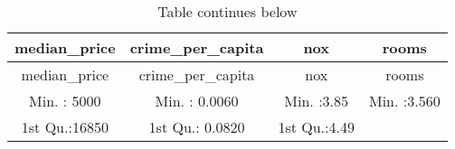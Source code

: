 \documentclass[
]{article}
\begin{document}
\begin{longtable}[]{@{}cccc@{}}
\caption{Table continues below}\tabularnewline
\toprule
\begin{minipage}[b]{0.20\columnwidth}\centering
median\_price\strut
\end{minipage} & \begin{minipage}[b]{0.23\columnwidth}\centering
crime\_per\_capita\strut
\end{minipage} & \begin{minipage}[b]{0.18\columnwidth}\centering
nox\strut
\end{minipage} & \begin{minipage}[b]{0.20\columnwidth}\centering
rooms\strut
\end{minipage}\tabularnewline
\midrule
\endfirsthead
\toprule
\begin{minipage}[b]{0.20\columnwidth}\centering
median\_price\strut
\end{minipage} & \begin{minipage}[b]{0.23\columnwidth}\centering
crime\_per\_capita\strut
\end{minipage} & \begin{minipage}[b]{0.18\columnwidth}\centering
nox\strut
\end{minipage} & \begin{minipage}[b]{0.20\columnwidth}\centering
rooms\strut
\end{minipage}\tabularnewline
\midrule
\endhead
\begin{minipage}[t]{0.20\columnwidth}\centering
Min. : 5000\strut
\end{minipage} & \begin{minipage}[t]{0.23\columnwidth}\centering
Min. : 0.0060\strut
\end{minipage} & \begin{minipage}[t]{0.18\columnwidth}\centering
Min. :3.85\strut
\end{minipage} & \begin{minipage}[t]{0.20\columnwidth}\centering
Min. :3.560\strut
\end{minipage}\tabularnewline
\begin{minipage}[t]{0.20\columnwidth}\centering
1st Qu.:16850\strut
\end{minipage} & \begin{minipage}[t]{0.23\columnwidth}\centering
1st Qu.: 0.0820\strut
\end{minipage} & \begin{minipage}[t]{0.18\columnwidth}\centering
1st Qu.:4.49\strut

\end{minipage}
\end{longtable}
\end{document}
